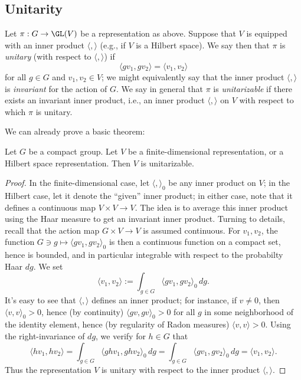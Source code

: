 \documentclass[reqno]{amsart} 
\begin{document}
\subsection{Unitarity}\label{sec:cnh2vn9afh}

\begin{definition}
  Let $\pi : G \rightarrow \GL(V)$ be a representation as above.  Suppose that $V$ is equipped with an inner product $\langle , \rangle$ (e.g., if $V$ is a Hilbert space).  We say then that $\pi$ is \emph{unitary} (with respect to $\langle , \rangle$) if
  \begin{equation*}
    \langle g v_1, g v_2 \rangle = \langle v_1, v_2 \rangle
  \end{equation*}
  for all $g \in G$ and $v_1, v_2 \in V$; we might equivalently say that the inner product $\langle , \rangle$ is \emph{invariant} for the action of $G$.  We say in general that $\pi$ is \emph{unitarizable} if there exists an invariant inner product, i.e., an inner product $\langle , \rangle$ on $V$ with respect to which $\pi$ is unitary.
\end{definition}
We can already prove a basic theorem:
\begin{theorem}\label{thm:compact-unitarizability}
  Let $G$ be a compact group.  Let $V$ be a finite-dimensional representation, or a Hilbert space representation.  Then $V$ is unitarizable.
\end{theorem}
\begin{proof}
  In the finite-dimensional case, let $\langle , \rangle_0$ be any inner product on $V$; in the Hilbert case, let it denote the ``given'' inner product; in either case, note that it defines a continuous map $V \times V \rightarrow V$.  The idea is to average this inner product using the Haar measure to get an invariant inner product.  Turning to details, recall that the action map $G \times V \rightarrow V$ is assumed continuous.  For $v_1, v_2$, the function $G \ni g \mapsto \langle g v_1, g v_2 \rangle_0$ is then a continuous function on a compact set, hence is bounded, and in particular integrable with respect to the probabilty Haar $d g$.  We set
  \begin{equation*}
    \langle v_1, v_2 \rangle := \int_{g \in G} \langle g v_1, g v_2 \rangle_0 \, d g.
  \end{equation*}
  It's easy to see that $\langle , \rangle$ defines an inner product; for instance, if $v \neq 0$, then $\langle v,v \rangle_0 > 0$, hence (by continuity) $\langle g v, g v \rangle_0 > 0$ for all $g$ in some neighborhood of the identity element, hence (by regularity of Radon measures) $\langle v, v \rangle > 0$.  Using the right-invariance of $d g$, we verify for $h \in G$ that
  \begin{equation*}
    \langle h v_1, h v_2 \rangle = \int_{g \in G} \langle g h v_1, g h v_2 \rangle_0 \, d g = \int_{g \in G} \langle g v_1, g v_2 \rangle_0 \, d g = \langle v_1, v_2 \rangle.
  \end{equation*}
  Thus the representation $V$ is unitary with respect to the inner product $\langle , \rangle$.
\end{proof}
\end{document}
